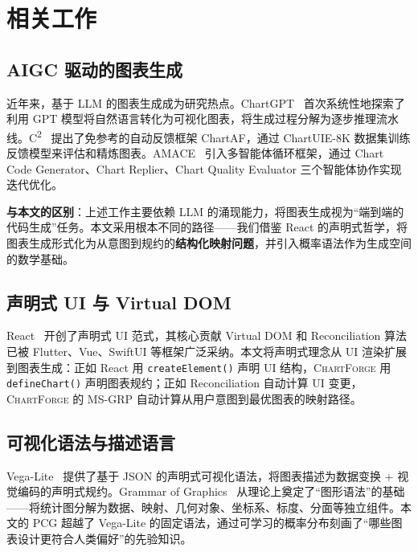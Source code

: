 \documentclass[12pt,a4paper]{ctexart}
\theoremstyle{remark}
\newcommand{\ChartForge}{\textsc{ChartForge}}
\begin{document}
\section{相关工作}

\subsection{AIGC 驱动的图表生成}

近年来，基于 LLM 的图表生成成为研究热点。ChartGPT~\cite{tian2024chartgpt} 首次系统性地探索了利用 GPT 模型将自然语言转化为可视化图表，将生成过程分解为逐步推理流水线。C\textsuperscript{2}~\cite{koh2024c2} 提出了免参考的自动反馈框架 ChartAF，通过 ChartUIE-8K 数据集训练反馈模型来评估和精炼图表。AMACE~\cite{namgoong2025amace} 引入多智能体循环框架，通过 Chart Code Generator、Chart Replier、Chart Quality Evaluator 三个智能体协作实现迭代优化。

\textbf{与本文的区别}：上述工作主要依赖 LLM 的涌现能力，将图表生成视为“端到端的代码生成”任务。本文采用根本不同的路径——我们借鉴 React 的声明式哲学，将图表生成形式化为从意图到规约的\textbf{结构化映射问题}，并引入概率语法作为生成空间的数学基础。

\subsection{声明式 UI 与 Virtual DOM}

React~\cite{walke2013react} 开创了声明式 UI 范式，其核心贡献 Virtual DOM 和 Reconciliation 算法已被 Flutter、Vue、SwiftUI 等框架广泛采纳。本文将声明式理念从 UI 渲染扩展到图表生成：正如 React 用 \texttt{createElement()} 声明 UI 结构，\ChartForge{} 用 \texttt{defineChart()} 声明图表规约；正如 Reconciliation 自动计算 UI 变更，\ChartForge{} 的 MS-GRP 自动计算从用户意图到最优图表的映射路径。

\subsection{可视化语法与描述语言}

Vega-Lite~\cite{satyanarayan2017vega} 提供了基于 JSON 的声明式可视化语法，将图表描述为数据变换 $+$ 视觉编码的声明式规约。Grammar of Graphics~\cite{wilkinson2005grammar} 从理论上奠定了“图形语法”的基础——将统计图分解为数据、映射、几何对象、坐标系、标度、分面等独立组件。本文的 PCG 超越了 Vega-Lite 的固定语法，通过可学习的概率分布刻画了“哪些图表设计更符合人类偏好”的先验知识。
\end{document}
